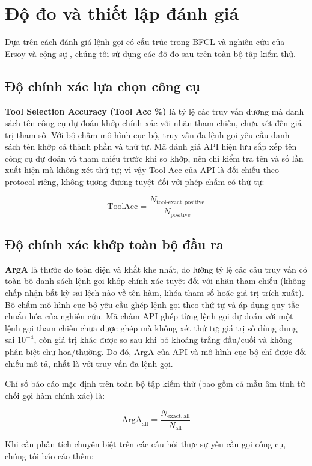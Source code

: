 \documentclass[10pt,twocolumn,a4paper]{article}
\begin{document}
\section{Độ đo và thiết lập đánh giá}

Dựa trên cách đánh giá lệnh gọi có cấu trúc trong BFCL \cite{yan2024bfcl} và nghiên cứu của Ersoy và cộng sự \cite{ersoy2025tool}, chúng tôi sử dụng các độ đo sau trên toàn bộ tập kiểm thử.

\subsection{Độ chính xác lựa chọn công cụ}
\textbf{Tool Selection Accuracy (Tool Acc \%)} là tỷ lệ các truy vấn dương mà danh sách tên công cụ dự đoán khớp chính xác với nhãn tham chiếu, chưa xét đến giá trị tham số. Với bộ chấm mô hình cục bộ, truy vấn đa lệnh gọi yêu cầu danh sách tên khớp cả thành phần và thứ tự. Mã đánh giá API hiện lưu sắp xếp tên công cụ dự đoán và tham chiếu trước khi so khớp, nên chỉ kiểm tra tên và số lần xuất hiện mà không xét thứ tự; vì vậy Tool Acc của API là đối chiếu theo protocol riêng, không tương đương tuyệt đối với phép chấm có thứ tự:

$$\mathrm{ToolAcc} = \frac{N_{\mathrm{tool\text{-}exact, positive}}}{N_{\mathrm{positive}}}$$

\subsection{Độ chính xác khớp toàn bộ đầu ra}
\textbf{ArgA} là thước đo toàn diện và khắt khe nhất, đo lường tỷ lệ các câu truy vấn có toàn bộ danh sách lệnh gọi khớp chính xác tuyệt đối với nhãn tham chiếu (không chấp nhận bất kỳ sai lệch nào về tên hàm, khóa tham số hoặc giá trị trích xuất). Bộ chấm mô hình cục bộ yêu cầu ghép lệnh gọi theo thứ tự và áp dụng quy tắc chuẩn hóa của nghiên cứu. Mã chấm API ghép từng lệnh gọi dự đoán với một lệnh gọi tham chiếu chưa được ghép mà không xét thứ tự; giá trị số dùng dung sai $10^{-4}$, còn giá trị khác được so sau khi bỏ khoảng trắng đầu/cuối và không phân biệt chữ hoa/thường. Do đó, ArgA của API và mô hình cục bộ chỉ được đối chiếu mô tả, nhất là với truy vấn đa lệnh gọi.

Chỉ số báo cáo mặc định trên toàn bộ tập kiểm thử (bao gồm cả mẫu âm tính từ chối gọi hàm chính xác) là:

$$\mathrm{ArgA}_{\mathrm{all}} = \frac{N_{\mathrm{exact, all}}}{N_{\mathrm{all}}}$$

Khi cần phân tích chuyên biệt trên các câu hỏi thực sự yêu cầu gọi công cụ, chúng tôi báo cáo thêm:
\end{document}
